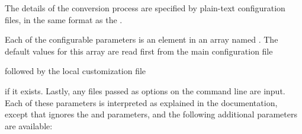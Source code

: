 The details of the conversion process are specified by plain-text
configuration files, in the same format as the
.

Each of the configurable parameters is an element in an array named
.  The default values for this array are read first
from the main configuration file
\begin{quote}
\end{quote}
followed by the local customization file
\begin{quote}
\end{quote}
if it exists.  Lastly, any files passed as  options on the
command line are input.  Each of these parameters is interpreted as
explained in the 
documentation, except that  ignores the
 and 
parameters, and the following additional parameters are available:
